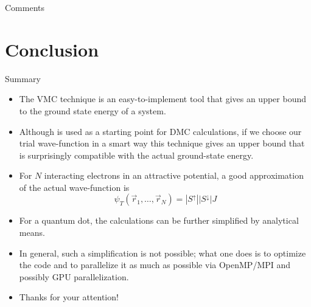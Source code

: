 \documentclass[10pt, compress, usetitleprogressbar, protectframetitle]{beamer}
\begin{document}
\begin{versionLONG}
\begin{frame}{Comments}
\end{frame}

\end{versionLONG}

\section{Conclusion}

\begin{frame}{Summary}

	\begin{itemize}[<+->]
		\item The VMC technique is an easy-to-implement tool that gives an upper bound to the ground state energy of a system.
		\item Although is used as a starting point for DMC calculations, if we choose our trial wave-function in a smart way this technique gives an upper bound that is surprisingly compatible with the actual ground-state energy.
		\item For $N$ interacting electrons in an attractive potential, a good approximation of the actual wave-function is
		\begin{equation*}
			\psi_T(\vec{r}_1,\ldots,\vec{r}_N) = |S^{\uparrow}||S^{\downarrow}|J
		\end{equation*}
		\item For a quantum dot, the calculations can be further simplified by analytical means.
		\item In general, such a simplification is not possible; what one does is to optimize the code and to parallelize it as much as possible via OpenMP/MPI and possibly GPU parallelization.
		\item \alert{Thanks for your attention!}
	\end{itemize}
	

\end{frame}

\end{document}
